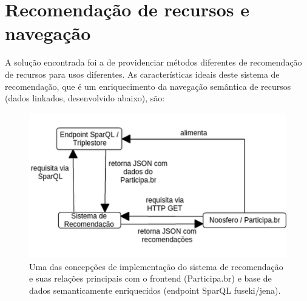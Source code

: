 \documentclass[a4paper, 11pt]{article} %
\begin{document}
\section*{Recomendação de recursos e navegação}
A solução encontrada foi a de providenciar métodos diferentes de recomendação de recursos para usos diferentes. As características ideais deste sistema de recomendação, que é um enriquecimento da navegação semântica de recursos (dados linkados, desenvolvido abaixo), são:
\begin{figure}[h!]
  \centering
    \includegraphics[width=.7\textwidth]{sr.png}
  \caption{\small Uma das concepções de implementação do sistema de recomendação e suas relações principais com o frontend (Participa.br) e base de dados semanticamente enriquecidos (endpoint SparQL fuseki/jena).}\label{fig:rec}
\end{figure}
\end{document}
